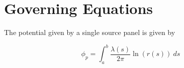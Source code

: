 \section{Governing Equations}
\label{sec:governing_equations}

The potential given by a single source panel is given by

\[
\phi_p = \int_{a}^{b} \frac{\lambda(s)}{2\pi} \ln(r(s)) \ ds
\]